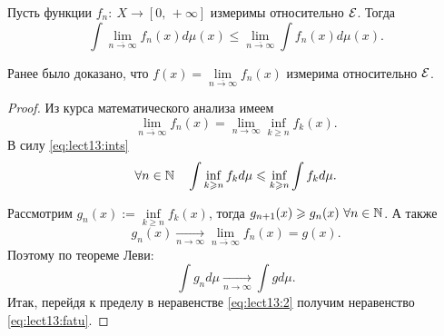 \begin{lemma}[Фату]
    Пусть функции $f_n:\: X\to[0,\, +\infty]$ измеримы относительно $\mathcal{E}$. Тогда
    \begin{equation}
        \label{eq:lect13:fatu}
        \int \lim_{\overline{n\to\infty}}f_n(x)d\mu(x)\leqslant\lim_{\overline{n\to\infty}}
        \int f_n(x)d\mu(x).
    \end{equation}

    \begin{remark}
        Ранее было доказано, что $f(x)=\lim\limits_{\overline{n\to\infty}}f_n(x)$ измерима
        относительно $\mathcal{E}$.
    \end{remark}

    \begin{proof}

        Из курса математического анализа имеем \[
            \lim_{\overline{n\to\infty}} f_n(x)=\lim_{n\to\infty}\inf_{k\geqslant n}f_k(x).
        \]
        В силу \eqref{eq:lect13:ints} \begin{equation}
            \label{eq:lect13:2}
            \forall n\in\mathbb{N}\quad \int \inf_{k\geqslant n}f_kd\mu\leqslant\inf_{k\geqslant n}\int f_kd\mu.
        \end{equation}

        Рассмотрим $g_n(x):=\inf\limits_{k\geqslant n} f_k(x)$, тогда
        $g_{n+1}(x)\geqslant g_n(x)\ \forall n\in\mathbb{N}$. А также \[
            g_n(x)\xrightarrow[n\to\infty]{}\lim_{\overline{n\to\infty}}f_n(x)=g(x).
        \]
        Поэтому по теореме Леви: \[
            \int g_nd\mu\xrightarrow[n\to\infty]{}\int gd\mu.
        \]
        Итак, перейдя к пределу в неравенстве \eqref{eq:lect13:2} получим неравенство \eqref{eq:lect13:fatu}.

    \end{proof}
\end{lemma}

